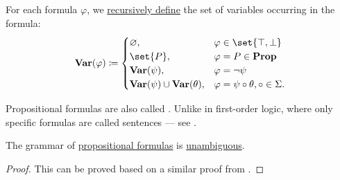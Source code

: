 \begin{definition}
\begin{thmenum}
     For each formula \( \varphi \), we \hyperref[rem:evaluation]{recursively define} the set of variables occurring in the formula:
    \begin{equation}\label{eq:def:propositional_syntax/varables}
      \boldop{Var}(\varphi) \coloneqq \begin{cases}
        \varnothing,                                  &\varphi \in \set{ \top, \bot } \\
        \set{ P },                                    &\varphi = P \in \boldop{Prop} \\
        \boldop{Var}(\psi),                           &\varphi = \neg \psi \\
        \boldop{Var}(\psi) \cup \boldop{Var}(\theta), &\varphi = \psi \bincirc \theta, \bincirc \in \Sigma.
      \end{cases}
    \end{equation}
  \end{thmenum}
\end{definition}
\begin{comments}
  \item Propositional formulas are also called . Unlike in first-order logic, where only specific formulas are called sentences --- see .
\end{comments}

\begin{proposition}\label{thm:propositional_formulas_are_unambiguous}
  The grammar of \hyperref[def:propositional_syntax/formula]{propositional formulas} is \hyperref[def:grammar_ambiguity]{unambiguous}.
\end{proposition}
\begin{proof}
  This can be proved based on a similar proof from .
\end{proof}

